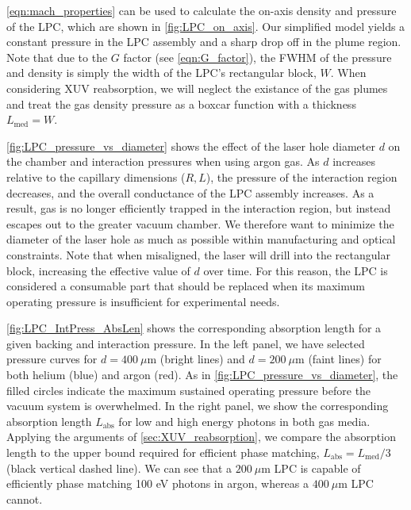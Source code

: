 \cref{eqn:mach_properties} can be used to calculate the on-axis density and pressure of the LPC, which are shown in \cref{fig:LPC_on_axis}. Our simplified model yields a constant pressure in the LPC assembly and a sharp drop off in the plume region. Note that due to the $G$ factor (see \cref{eqn:G_factor}), the FWHM of the pressure and density is simply the width of the LPC's rectangular block, $W$. When considering XUV reabsorption, we will neglect the existance of the gas plumes and treat the gas density pressure as a boxcar function with a thickness ${L_{\textrm{med}}=W}$.

\cref{fig:LPC_pressure_vs_diameter} shows the effect of the laser hole diameter $d$ on the chamber and interaction pressures when using argon gas. As $d$ increases relative to the capillary dimensions ($R, L$), the pressure of the interaction region decreases, and the overall conductance of the LPC assembly increases. As a result, gas is no longer efficiently trapped in the interaction region, but instead escapes out to the greater vacuum chamber. We therefore want to minimize the diameter of the laser hole as much as possible within manufacturing and optical constraints. Note that when misaligned, the laser will drill into the rectangular block, increasing the effective value of $d$ over time. For this reason, the LPC is considered a consumable part that should be replaced when its maximum operating pressure is insufficient for experimental needs.

\cref{fig:LPC_IntPress_AbsLen} shows the corresponding absorption length for a given backing and interaction pressure. In the left panel, we have selected pressure curves for $d = 400 \ \mu\textrm{m}$ (bright lines) and $d = 200 \ \mu\textrm{m}$ (faint lines) for both helium (blue) and argon (red). As in \cref{fig:LPC_pressure_vs_diameter}, the filled circles indicate the maximum sustained operating pressure before the vacuum system is overwhelmed. In the right panel, we show the corresponding absorption length $L_{\textrm{abs}}$ for low and high energy photons in both gas media. Applying the arguments of \cref{sec:XUV_reabsorption}, we compare the absorption length to the upper bound required for efficient phase matching, $L_{\textrm{abs}} = L_{\textrm{med}}/3$ (black vertical dashed line). We can see that a $200 \ \mu\textrm{m}$ LPC is capable of efficiently phase matching 100 eV photons in argon, whereas a $400 \ \mu\textrm{m}$ LPC cannot.


